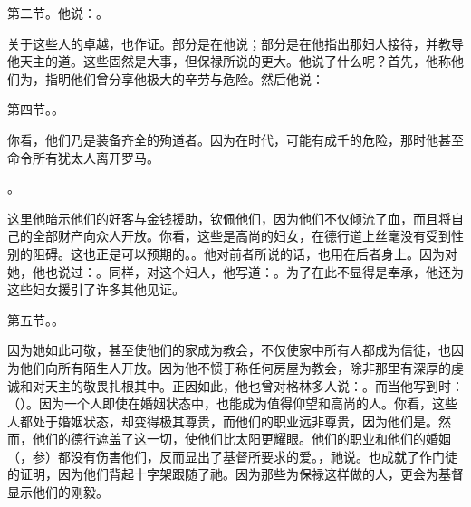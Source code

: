 第二节。他说：。\par

关于这些人的卓越，也作证。部分是在他说；部分是在他指出那妇人接待，并教导他天主的道。这些固然是大事，但保禄所说的更大。他说了什么呢？首先，他称他们为，指明他们曾分享他极大的辛劳与危险。然后他说：\par

第四节。。\par

你看，他们乃是装备齐全的殉道者。因为在时代，可能有成千的危险，那时他甚至命令所有犹太人离开罗马。\par

。\par

这里他暗示他们的好客与金钱援助，钦佩他们，因为他们不仅倾流了血，而且将自己的全部财产向众人开放。你看，这些是高尚的妇女，在德行道上丝毫没有受到性别的阻碍。这也正是可以预期的。。他对前者所说的话，也用在后者身上。因为对她，他也说过：。同样，对这个妇人，他写道：。为了在此不显得是奉承，他还为这些妇女援引了许多其他见证。\par

第五节。。\par

因为她如此可敬，甚至使他们的家成为教会，不仅使家中所有人都成为信徒，也因为他们向所有陌生人开放。因为他不惯于称任何房屋为教会，除非那里有深厚的虔诚和对天主的敬畏扎根其中。正因如此，他也曾对格林多人说：。而当他写到时：（）。因为一个人即使在婚姻状态中，也能成为值得仰望和高尚的人。你看，这些人都处于婚姻状态，却变得极其尊贵，而他们的职业远非尊贵，因为他们是。然而，他们的德行遮盖了这一切，使他们比太阳更耀眼。他们的职业和他们的婚姻（，参）都没有伤害他们，反而显出了基督所要求的爱。，祂说。也成就了作门徒的证明，因为他们背起十字架跟随了祂。因为那些为保禄这样做的人，更会为基督显示他们的刚毅。\par

